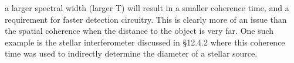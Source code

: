 {a larger spectral width (larger T) will result in a smaller coherence time, and a requirement for faster detection circuitry.  This is clearly more of an issue than the spatial coherence when the distance to the object is very far.  One such example is the stellar interferometer discussed in \citep{hecht1998hecht} \S 12.4.2 where this coherence time was used to indirectly determine the diameter of a stellar source.

}

